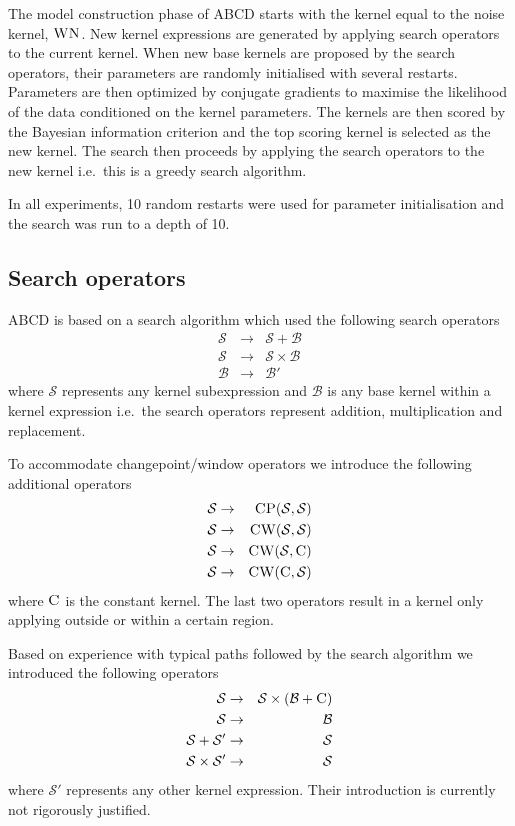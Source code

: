 \documentclass[letterpaper]{article}
\def\ie{i.e.\ }
\newcommand{\procedurename}{ABCD}
\begin{document}
The model construction phase of \procedurename{} starts with the kernel equal to the noise kernel, ${\textsc{WN}}$.
New kernel expressions are generated by applying search operators to the current kernel.
When new base kernels are proposed by the search operators, their parameters are randomly initialised with several restarts.
Parameters are then optimized by conjugate gradients to maximise the likelihood of the data conditioned on the kernel parameters.
The kernels are then scored by the Bayesian information criterion and the top scoring kernel is selected as the new kernel.
The search then proceeds by applying the search operators to the new kernel \ie this is a greedy search algorithm.

In all experiments, 10 random restarts were used for parameter initialisation and the search was run to a depth of 10.

\subsection{Search operators}

\procedurename{} is based on a search algorithm which used the following search operators
%
\begin{eqnarray}
\mathcal{S} &\to& \mathcal{S} + \mathcal{B} \\
\mathcal{S} &\to& \mathcal{S} \times \mathcal{B} \\
\mathcal{B} &\to& \mathcal{B'}
\end{eqnarray}
%
where $\mathcal{S}$ represents any kernel subexpression and $\mathcal{B}$ is any base kernel within a kernel expression \ie the search operators represent addition, multiplication and replacement.

To accommodate changepoint/window operators we introduce the following additional operators
%
\begin{eqnarray}
\mathcal{S} &\to& {\textsc{CP}}(\mathcal{S},\mathcal{S}) \\
\mathcal{S} &\to& {\textsc{CW}}(\mathcal{S},\mathcal{S}) \\
\mathcal{S} &\to& {\textsc{CW}}(\mathcal{S},{\textsc{C}}) \\
\mathcal{S} &\to& {\textsc{CW}}({\textsc{C}},\mathcal{S})
\end{eqnarray}
%
where ${\textsc{C}}$ is the constant kernel.
The last two operators result in a kernel only applying outside or within a certain region.

Based on experience with typical paths followed by the search algorithm we introduced the following operators
%
\begin{eqnarray}
\mathcal{S} &\to& \mathcal{S} \times (\mathcal{B} + {\textsc{C}})\\
\mathcal{S} &\to& \mathcal{B}\\
\mathcal{S} + \mathcal{S'} &\to& \mathcal{S}\\
\mathcal{S} \times \mathcal{S'} &\to& \mathcal{S}
\end{eqnarray}
%
where $\mathcal{S'}$ represents any other kernel expression.
Their introduction is currently not rigorously justified.
\end{document}
